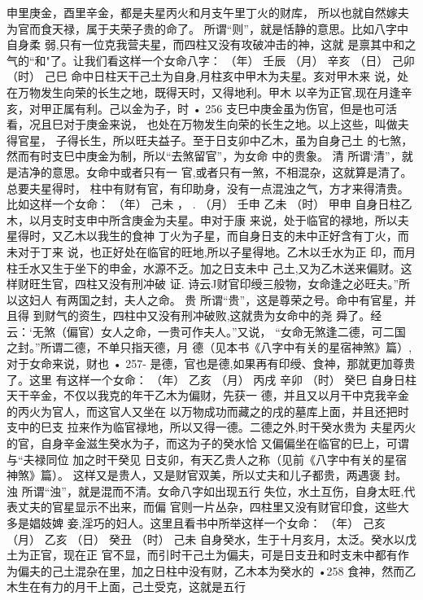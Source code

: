 申里庚金，酉里辛金，都是夫星丙火和月支午里丁火的财库，
所以也就自然嫁夫为官而食天禄，属于夫荣子贵的命了。
所谓“则”，就是恬静的意思。比如八字中自身柔
弱,只有一位克我营夫星，而四柱又没有攻破冲击的神，这就
是禀其中和之气的“和"了。让我们看这样一个女命八字：
（年） 壬辰
（月） 辛亥
（日） 己卯
（时） 己巳
命中日柱天干己土为自身,月柱亥中甲木为夫星。亥对甲木来
说，处在万物发生向荣的长生之地，既得天时，又得地利。甲木
以辛为正官,现在月逢辛亥，对甲正属有利。己以金为子，时
• 256
支巳中庚金虽为伤官，但是也可活看，况且巳对于庚金来说，
也处在万物发生向荣的长生之地。以上这些，叫做夫得官星，
子得长生，所以旺夫益子。至于日支卯中乙木，虽为自身己土
的七煞，然而有时支巳中庚金为制，所以“去煞留官”，为女命
中的贵象。
清 所谓‘清”，就是洁净的意思。女命中或者只有一
官,或者只有一煞，不相混杂，这就算是清了。总要夫星得时，
柱中有财有官，有印助身，没有一点混浊之气，方才来得清贵。
比如这样一个女命：
（年） 己未 ， .
（月） 壬申
乙未
（时） 甲申
自身日柱乙木，以月支时支申中所含庚金为夫星。申对于康
来说，处于临官的禄地，所以夫星得时，又乙木以我生的食神
丁火为子星，而自身日支的未中正好含有丁火，而未对于丁来
说，也正好处在临官的旺地,所以子星得地。乙木以壬水为正
印，而月柱壬水又生于坐下的申金，水源不乏。加之日支未中
己土,又为乙木送来偏财。这样财旺生官，四柱又没有刑冲破
证. 诗云J财官印绶三般物，女命逢之必旺夫。”所以这妇人
有两国之封，夫人之命。
贵 所谓“贵”，这是尊荣之号。命中有官星，并且得
到财气的资生，四柱中又没有刑冲破败,这就贵为女命中的尧
舜了。经云：‘无煞（偏官）女人之命，一贵可作夫人。”又说，
“女命无煞逢二德，可二国之封。”所谓二德，不单只指天德，月
德（见本书《八字中有关的星宿神煞》篇）,对于女命来说，财也
• 257-
是德，官也是德,如果再有印绶、食神，那就更加尊贵了。这里
有这样一个女命：
（年） 乙亥
（月） 丙戌
辛卯
（时） 癸巳
自身日柱天干辛金，不仅以我克的年干乙木为偏财，先获一
德，并且又以月干中克我辛金的丙火为官人，而这官人又坐在
以万物成功而藏之的戌的墓库上面，并且还把时支中的巳支
拉来作为临官禄地，所以又得一德。二德之外,时干癸水贵为
夫星丙火的官，自身辛金滋生癸水为子，而这为子的癸水恰
又偏偏坐在临官的巳上，可谓与“夫禄同位 加之时干癸见
日支卯，有天乙贵人之称（见前《八字中有关的星宿神煞》篇）。
这样又是贵人，又是财官双美，所以丈夫和儿子都贵，两遇褒
封。
浊 所谓“浊”，就是混而不清。女命八字如出现五行
失位，水土互伤，自身太旺,代表丈夫的官星显示不出来，而偏
官则一片丛杂，四柱里又没有财官印食，这些大多是娼妓婢
妾,淫巧的妇人。这里且看书中所举这样一个女命：
（年） 己亥
（月） 乙亥
（日） 癸丑
（时） 己未
自身癸水，生于十月亥月，太泛。癸水以戊土为正官，现在正
官不显，而引时干己土为偏夫，可是日支丑和时支未中都有作
为偏夫的己土混杂在里，加之日柱中没有财，乙木本为癸水的
•258
食神，然而乙木生在有力的月干上面，己土受克，这就是五行
